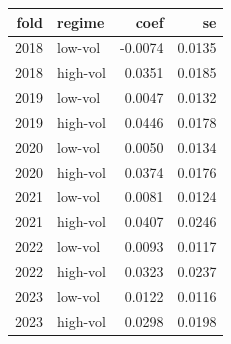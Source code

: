 \begin{tabular}{rlrr}
\toprule
fold & regime & coef & se \\
\midrule
2018 & low-vol & -0.0074 & 0.0135 \\
2018 & high-vol & 0.0351 & 0.0185 \\
2019 & low-vol & 0.0047 & 0.0132 \\
2019 & high-vol & 0.0446 & 0.0178 \\
2020 & low-vol & 0.0050 & 0.0134 \\
2020 & high-vol & 0.0374 & 0.0176 \\
2021 & low-vol & 0.0081 & 0.0124 \\
2021 & high-vol & 0.0407 & 0.0246 \\
2022 & low-vol & 0.0093 & 0.0117 \\
2022 & high-vol & 0.0323 & 0.0237 \\
2023 & low-vol & 0.0122 & 0.0116 \\
2023 & high-vol & 0.0298 & 0.0198 \\
\bottomrule
\end{tabular}

